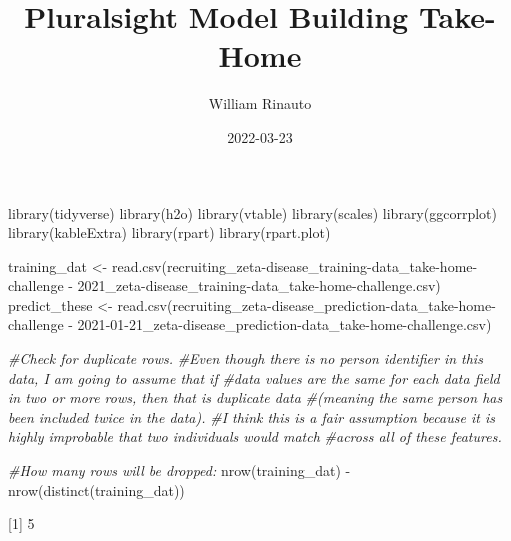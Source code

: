 \documentclass[
]{article}
\title{Pluralsight Model Building Take-Home}
\author{William Rinauto}
\date{2022-03-23}
\newenvironment{Shaded}{\begin{snugshade}}{\end{snugshade}}
\newcommand{\CommentTok}[1]{\textcolor[rgb]{0.56,0.35,0.01}{\textit{#1}}}
\newcommand{\FunctionTok}[1]{\textcolor[rgb]{0.00,0.00,0.00}{#1}}
\newcommand{\NormalTok}[1]{#1}
\newcommand{\OtherTok}[1]{\textcolor[rgb]{0.56,0.35,0.01}{#1}}
\newcommand{\SpecialCharTok}[1]{\textcolor[rgb]{0.00,0.00,0.00}{#1}}
\newcommand{\StringTok}[1]{\textcolor[rgb]{0.31,0.60,0.02}{#1}}
\begin{document}
\maketitle

\begin{Shaded}
\begin{Highlighting}[]
\FunctionTok{library}\NormalTok{(tidyverse)}
\FunctionTok{library}\NormalTok{(h2o)}
\FunctionTok{library}\NormalTok{(vtable)}
\FunctionTok{library}\NormalTok{(scales)}
\FunctionTok{library}\NormalTok{(ggcorrplot)}
\FunctionTok{library}\NormalTok{(kableExtra)}
\FunctionTok{library}\NormalTok{(rpart)}
\FunctionTok{library}\NormalTok{(rpart.plot)}
\end{Highlighting}
\end{Shaded}

\begin{Shaded}
\begin{Highlighting}[]
\NormalTok{training\_dat }\OtherTok{\textless{}{-}} \FunctionTok{read.csv}\NormalTok{(}\StringTok{\textquotesingle{}recruiting\_zeta{-}disease\_training{-}data\_take{-}home{-}challenge {-} 2021\_zeta{-}disease\_training{-}data\_take{-}home{-}challenge.csv\textquotesingle{}}\NormalTok{)}
\NormalTok{predict\_these }\OtherTok{\textless{}{-}} \FunctionTok{read.csv}\NormalTok{(}\StringTok{\textquotesingle{}recruiting\_zeta{-}disease\_prediction{-}data\_take{-}home{-}challenge {-} 2021{-}01{-}21\_zeta{-}disease\_prediction{-}data\_take{-}home{-}challenge.csv\textquotesingle{}}\NormalTok{)}

\CommentTok{\#Check for duplicate rows.}
\CommentTok{\#Even though there is no person identifier in this data, I am going to assume that if }
\CommentTok{\#data values are the same for each data field in two or more rows, then that is duplicate data}
\CommentTok{\#(meaning the same person has been included twice in the data). }
\CommentTok{\#I think this is a fair assumption because it is highly improbable that two individuals would match }
\CommentTok{\#across all of these features. }

\CommentTok{\#How many rows will be dropped: }
\FunctionTok{nrow}\NormalTok{(training\_dat) }\SpecialCharTok{{-}} \FunctionTok{nrow}\NormalTok{(}\FunctionTok{distinct}\NormalTok{(training\_dat))}
\end{Highlighting}
\end{Shaded}

{[}1{]} 5
\end{document}

